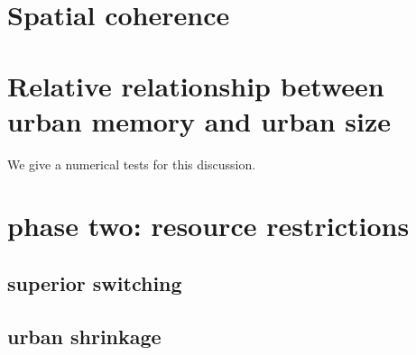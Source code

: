 \documentclass[aps,prl]{revtex4-1}
\begin{document}
\section{Spatial coherence}

\section{Relative relationship between urban memory and urban size}

We give a numerical tests for this discussion. 

\section{phase two: resource restrictions}

\subsection{superior switching}

\subsection{urban shrinkage}




\begin{thebibliography}{99}
\end{thebibliography}
    
    
\end{document}
